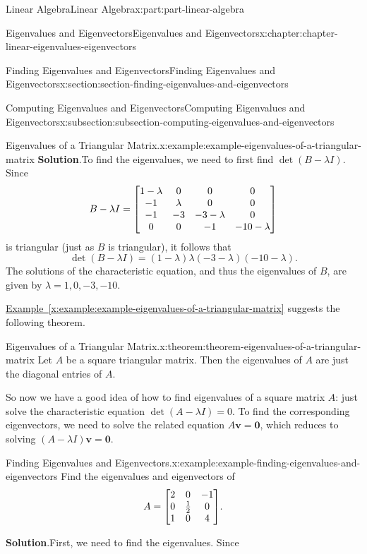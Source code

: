\documentclass[twoside,10pt,]{book}
\newcommand{\blocktitlefont}{\relax}
\newcommand{\xreffont}{\relax}
\numberwithin{equation}{part}
\providecommand{\vb}[1]{\mathbf{#1}}
\begin{document}
\begin{partptx}{Linear Algebra}{}{Linear Algebra}{}{}{x:part:part-linear-algebra}
\begin{chapterptx}{Eigenvalues and Eigenvectors}{}{Eigenvalues and Eigenvectors}{}{}{x:chapter:chapter-linear-eigenvalues-eigenvectors}
\begin{sectionptx}{Finding Eigenvalues and Eigenvectors}{}{Finding Eigenvalues and Eigenvectors}{}{}{x:section:section-finding-eigenvalues-and-eigenvectors}
\begin{subsectionptx}{Computing Eigenvalues and Eigenvectors}{}{Computing Eigenvalues and Eigenvectors}{}{}{x:subsection:subsection-computing-eigenvalues-and-eigenvectors}
\begin{example}{Eigenvalues of a Triangular Matrix.}{x:example:example-eigenvalues-of-a-triangular-matrix}
\noindent\textbf{\blocktitlefont Solution}.\hypertarget{g:solution:idm1630878904}{}\quad{}To find the eigenvalues, we need to first find \(\det(B-\lambda I)\). Since%
\begin{equation*}
B-\lambda I = \mqty[1-\lambda & 0 & 0 & 0 \\ -1 & \lambda & 0 & 0 \\ -1 & -3 & -3-\lambda & 0 \\ 0 & 0 & -1 & -10-\lambda]
\end{equation*}
is triangular (just as \(B\) is triangular), it follows that%
\begin{equation*}
\det(B - \lambda I) = (1-\lambda)\lambda(-3-\lambda)(-10-\lambda).
\end{equation*}
The solutions of the characteristic equation, and thus the eigenvalues of \(B\), are given by \(\lambda = 1, 0, -3, -10\).%
\end{example}
\hyperref[x:example:example-eigenvalues-of-a-triangular-matrix]{Example~{\xreffont\ref{x:example:example-eigenvalues-of-a-triangular-matrix}}} suggests the following theorem.%
\begin{theorem}{Eigenvalues of a Triangular Matrix.}{}{x:theorem:theorem-eigenvalues-of-a-triangular-matrix}%
Let \(A\) be a square triangular matrix. Then the eigenvalues of \(A\) are just the diagonal entries of \(A\).%
\end{theorem}
So now we have a good idea of how to find eigenvalues of a square matrix \(A\): just solve the characteristic equation \(\det(A-\lambda I) = 0\). To find the corresponding eigenvectors, we need to solve the related equation \(A\vb{v} = \vb{0}\), which reduces to solving \((A-\lambda I)\vb{v} = \vb{0}\).%
\begin{example}{Finding Eigenvalues and Eigenvectors.}{x:example:example-finding-eigenvalues-and-eigenvectors}%
Find the eigenvalues and eigenvectors of%
\begin{equation*}
A = \mqty[2 & 0 & -1 \\ 0 & \frac{1}{2} & 0 \\ 1 & 0 & 4].
\end{equation*}
%
\par\smallskip%
\noindent\textbf{\blocktitlefont Solution}.\hypertarget{g:solution:idm1630876216}{}\quad{}First, we need to find the eigenvalues. Since%
\begin{equation*}

\end{equation*}
\end{example}
\end{subsectionptx}
\end{sectionptx}
\end{chapterptx}
\end{partptx}
\end{document}

